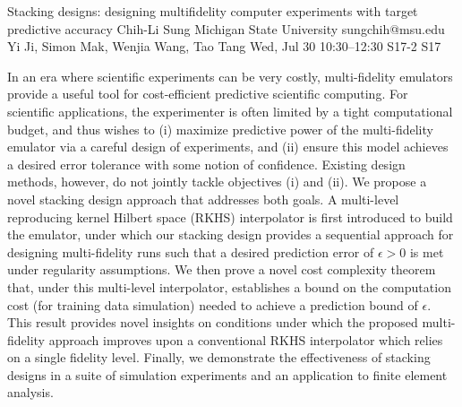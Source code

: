 \begin{talk}
  {Stacking designs: designing multifidelity computer experiments with target predictive accuracy}%
  {Chih-Li Sung}%
  {Michigan State University}%
  {sungchih@msu.edu}%
  {Yi Ji, Simon Mak, Wenjia Wang, Tao Tang}%
  {}%
  {Wed, Jul 30 10:30–12:30}%
  {S17-2}%
  {S17}%
  
				
			
In an era where scientific experiments can be very costly, multi-fidelity emulators provide a useful tool for cost-efficient predictive scientific computing. For scientific applications, the experimenter is often limited by a tight computational budget, and thus wishes to (i) maximize predictive power of the multi-fidelity emulator via a careful design of experiments, and (ii) ensure this model achieves a desired error tolerance with some notion of confidence. Existing design methods, however, do not jointly tackle objectives (i) and (ii). We propose a novel stacking design approach that addresses both goals. A  multi-level reproducing kernel Hilbert space (RKHS) interpolator is first introduced to build the emulator, under which our stacking design provides a sequential approach for designing multi-fidelity runs such that a desired prediction error of $\epsilon > 0$ is met under regularity assumptions. We then prove a novel cost complexity theorem that, under this multi-level interpolator, establishes a bound on the computation cost (for training data simulation) needed to achieve a prediction bound of $\epsilon$. This result provides novel insights on conditions under which the proposed multi-fidelity approach improves upon a conventional RKHS interpolator which relies on a single fidelity level. Finally, we demonstrate the effectiveness of stacking designs in a suite of simulation experiments and an application to finite element analysis.

\end{talk}

